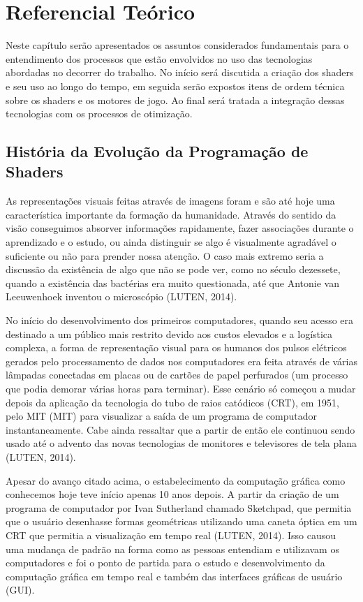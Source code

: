\chapter{Referencial Teórico}
\label{cap:referencial-teorico}

Neste capítulo serão apresentados os assuntos considerados fundamentais para o entendimento dos processos que estão envolvidos no uso das tecnologias abordadas no decorrer do trabalho. No início será discutida a criação dos shaders e seu uso ao longo do tempo, em seguida serão expostos itens de ordem técnica sobre os shaders e os motores de jogo. Ao final será tratada a integração dessas tecnologias com os processos de otimização.

\section{História da Evolução da Programação de Shaders}
\label{sec:historia-evolucao-programacao-shaders}

As representações visuais feitas através de imagens foram e são até hoje uma característica importante da formação da humanidade. Através do sentido da visão conseguimos absorver informações rapidamente, fazer associações durante o aprendizado e o estudo, ou ainda distinguir se algo é visualmente agradável o suficiente ou não para prender nossa atenção. O caso mais extremo seria a discussão da existência de algo que não se pode ver, como no século dezessete, quando a existência das bactérias era muito questionada, até que Antonie van Leeuwenhoek inventou o microscópio (LUTEN, 2014)\nocite{openGLBook}.

No início do desenvolvimento dos primeiros computadores, quando seu acesso era destinado a um público mais restrito devido aos custos elevados e a logística complexa, a forma de representação visual para os humanos dos pulsos elétricos gerados pelo processamento de dados nos computadores era feita através de várias lâmpadas conectadas em placas ou de cartões de papel perfurados (um processo que podia demorar várias horas para terminar). Esse cenário só começou a mudar depois da aplicação da tecnologia do tubo de raios catódicos (\acrshort{CRT}), em 1951, pelo MIT (\acrlong{MIT}) para visualizar a saída de um programa de computador instantaneamente. Cabe ainda ressaltar que a partir de então ele continuou sendo usado até o advento das novas tecnologias de monitores e televisores de tela plana (LUTEN, 2014)\nocite{openGLBook}.

Apesar do avanço citado acima, o estabelecimento da computação gráfica como conhecemos hoje teve início apenas 10 anos depois. A partir da criação de um programa de computador por Ivan Sutherland chamado Sketchpad, que permitia que o usuário desenhasse formas geométricas utilizando uma caneta óptica em um \acrshort{CRT} que permitia a visualização em tempo real (LUTEN, 2014)\nocite{openGLBook}. Isso causou uma mudança de padrão na forma como as pessoas entendiam e utilizavam os computadores e foi o ponto de partida para o estudo e desenvolvimento da computação gráfica em tempo real e também das interfaces gráficas de usuário (\acrshort{GUI}).

